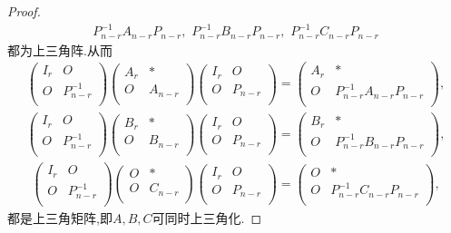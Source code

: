 \documentclass[../../main.tex]{subfiles}%
\begin{document}
\begin{proof}
\begin{align*}
P_{n-r}^{-1}A_{n-r}P_{n-r},\,\,P_{n-r}^{-1}B_{n-r}P_{n-r},\,\,P_{n-r}^{-1}C_{n-r}P_{n-r}
\end{align*}
都为上三角阵.从而
\begin{align*}
\begin{pmatrix}
I_r&		O\\
O&		P_{n-r}^{-1}\\
\end{pmatrix} \begin{pmatrix}
A_r&		*\\
O&		A_{n-r}\\
\end{pmatrix} \begin{pmatrix}
I_r&		O\\
O&		P_{n-r}\\
\end{pmatrix} =\begin{pmatrix}
A_r&		*\\
O&		P_{n-r}^{-1}A_{n-r}P_{n-r}\\
\end{pmatrix},
\end{align*}
\begin{align*}
\begin{pmatrix}
I_r&		O\\
O&		P_{n-r}^{-1}\\
\end{pmatrix} \begin{pmatrix}
B_r&		*\\
O&		B_{n-r}\\
\end{pmatrix} \begin{pmatrix}
I_r&		O\\
O&		P_{n-r}\\
\end{pmatrix} =\begin{pmatrix}
B_r&		*\\
O&		P_{n-r}^{-1}B_{n-r}P_{n-r}\\
\end{pmatrix},
\end{align*}
\begin{align*}
\begin{pmatrix}
I_r&		O\\
O&		P_{n-r}^{-1}\\
\end{pmatrix} \begin{pmatrix}
O&		*\\
O&		C_{n-r}\\
\end{pmatrix} \begin{pmatrix}
I_r&		O\\
O&		P_{n-r}\\
\end{pmatrix} =\begin{pmatrix}
O&		*\\
O&		P_{n-r}^{-1}C_{n-r}P_{n-r}\\
\end{pmatrix},
\end{align*}
都是上三角矩阵,即$A,B,C$可同时上三角化.

\end{proof}
\end{document}
